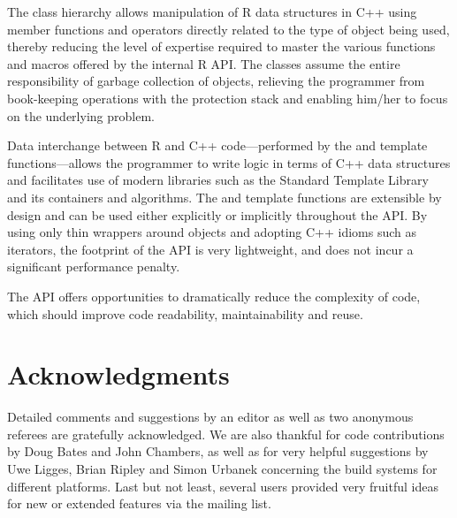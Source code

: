 The class hierarchy allows manipulation of R data structures in C++ 
using member functions and operators directly related to the type
of object being used, thereby reducing the level of expertise
required to master the various functions and macros offered by the
internal R API. The classes assume the entire 
responsibility of garbage collection of objects, relieving the 
programmer from book-keeping operations with the protection stack 
and enabling him/her to focus on the underlying problem. 

Data interchange between R and C++ code---performed by the  and
 template functions---allows the programmer to write logic in terms
of C++ data structures and facilitates use of modern libraries such as the
Standard Template Library and its containers and algorithms. The
 and  template functions are extensible by design and
can be used either explicitly or implicitly throughout the API.
By using only thin wrappers around  objects and adopting C++
idioms such as iterators, the footprint of the  API 
is very lightweight, and does not incur a significant performance penalty. 

The  API offers opportunities to dramatically reduce the complexity
of code, which should improve code readability, maintainability and reuse.

\section{Acknowledgments}

Detailed comments and suggestions by an editor as well as two anonymous referees
are gratefully acknowledged.  We are also thankful for code contributions by
Doug Bates and John Chambers, as well as for very helpful suggestions by Uwe
Ligges, Brian Ripley and Simon Urbanek concerning the build systems for different
platforms.   Last but not least, several users provided very fruitful
ideas for new or extended features via the  mailing list.



\address{Dirk Eddelbuettel\\
  Debian Project\\
  Chicago, IL\\
  USA}\\

\address{Romain Fran\c{c}ois\\
  Professional R Enthusiast\\
  1 rue du Puits du Temple, 34 000 Montpellier\\
  FRANCE}\\

